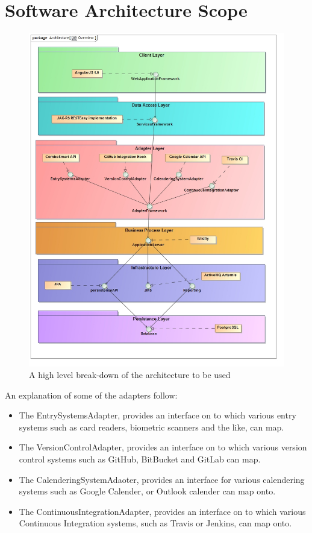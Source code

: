 \documentclass[11pt,a4paper]{article}
\begin{document}
\section{Software Architecture Scope}
\begin{figure}[H]
	\begin{center}
		\includegraphics[scale=0.4]{../Images/Architecture_Overview.jpg}
		\caption{A high level break-down of the architecture to be used}
	\end{center}
\end{figure}

\pagebreak

An explanation of some of the adapters follow:
\begin{itemize}
	\item The EntrySystemsAdapter, provides an interface on to which various entry systems such as card readers, biometric scanners and the like, can map.
	\item The VersionControlAdapter, provides an interface on to which various version control systems such as GitHub, BitBucket and GitLab can map.
	\item The CalenderingSystemAdaoter, provides an interface for various calendering systems such as Google Calender, or Outlook calender can map onto.
	\item The ContinuousIntegrationAdapter, provides an interface on to which various Continuous Integration systems, such as Travis or Jenkins, can map onto.\\\\
\end{itemize}
\end{document}
